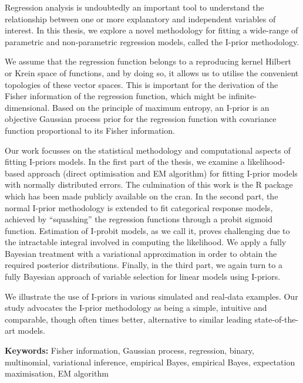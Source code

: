 Regression analysis is undoubtedly an important tool to understand the relationship between one or more explanatory and independent variables of interest. 
In this thesis, we explore a novel methodology for fitting a wide-range of parametric and non-parametric regression models, called the I-prior methodology. 

We assume that the regression function belongs to a reproducing kernel Hilbert or Krein space of functions, and by doing so, it allows us to utilise the convenient topologies of these vector spaces. 
This is important for the derivation of the Fisher information of the regression function, which might be infinite-dimensional. Based on the principle of maximum entropy, an I-prior is an objective Gaussian process prior for the regression function with covariance function proportional to its Fisher information. 

Our work focusses on the statistical methodology and computational aspects of fitting I-priors models. In the first part of the thesis, we examine a likelihood-based approach (direct optimisation and EM algorithm) for fitting I-prior models with normally distributed errors.
The culmination of this work is the R package  which has been made publicly available on the \gls*{cran}. In the second part, the normal I-prior methodology is extended to fit categorical response models, achieved by ``squashing'' the regression functions through a probit sigmoid function.
 Estimation of I-probit models, as we call it, proves challenging due to the intractable integral involved in computing the likelihood. 
 We apply a fully Bayesian treatment with a variational approximation in order to obtain the required posterior distributions. 
 Finally, in the third part, we again turn to a fully Bayesian approach of variable selection for linear models using I-priors.

We illustrate the use of I-priors in various simulated and real-data examples. 
Our study advocates the I-prior methodology as being a simple, intuitive and comparable, though often times better, alternative to similar leading state-of-the-art models. 


\vspace{1em}
{\noindent\textbf{Keywords:} 
	Fisher information, Gaussian process, regression, binary, multinomial, variational inference, empirical Bayes, empirical Bayes, expectation maximisation, EM algorithm
}